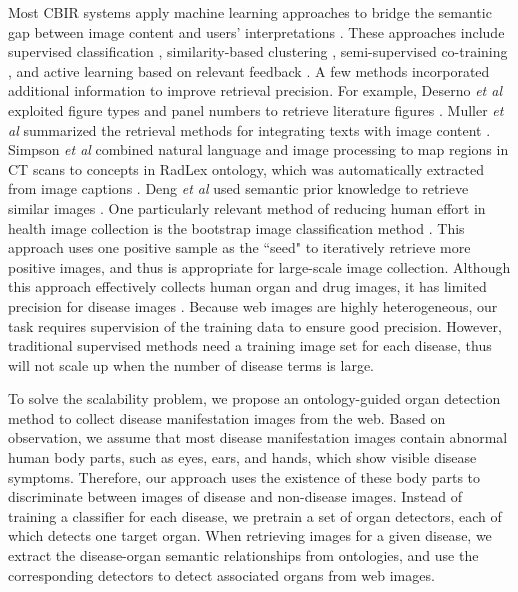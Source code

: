 Most CBIR systems apply machine learning approaches to
bridge the semantic gap between image content and users' interpretations \cite{datta2008image}.
These approaches include supervised classification \cite{chapelle1999support},
similarity-based clustering \cite{li2008real}, semi-supervised
co-training \cite{feng2004bootstrapping}, and active learning based on relevant feedback \cite{tong2001support}.
A few methods incorporated additional information to improve
retrieval precision. For example, Deserno {\it et al} exploited
figure types and panel numbers to retrieve literature figures \cite{deserno2009content}.
Muller {\it et al} summarized the retrieval methods for integrating
texts with image content \cite{muller2012overview}.
Simpson {\it et al} combined natural language
and image processing to map regions in CT scans to concepts
in RadLex ontology, which was automatically extracted
from image captions \cite{simpson2012towards}.
Deng {\it et al} used semantic prior knowledge
to retrieve similar images \cite{deng2011hierarchical}. One particularly relevant
method of reducing human effort in health image collection is
the bootstrap image classification method \cite{chen2012semi}. This approach uses
one positive sample as the ``seed" to iteratively retrieve more
positive images, and thus is appropriate for large-scale image
collection. Although this approach effectively collects human
organ and drug images, it has limited precision for disease
images \cite{chen2012semi}. Because web images are highly heterogeneous, our
task requires supervision of the training data to ensure good
precision. However, traditional supervised methods need a training
image set for each disease, thus will not scale up
when the number of disease terms is large.

To solve the scalability problem, we propose an ontology-guided
organ detection method to collect disease manifestation
images from the web. Based on observation, we assume that
most disease manifestation images contain abnormal human
body parts, such as eyes, ears, and hands, which show visible
disease symptoms. Therefore, our approach uses the existence
of these body parts to discriminate between images of disease
and non-disease images. Instead of training a classifier for each
disease, we pretrain a set of organ detectors, each of which
detects one target organ. When retrieving images for a given
disease, we extract the disease-organ semantic relationships
from ontologies, and use the corresponding detectors to detect
associated organs from web images.

